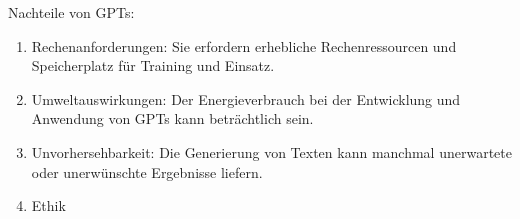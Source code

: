 Nachteile von GPTs:
\begin{enumerate}
    \item Rechenanforderungen: Sie erfordern erhebliche Rechenressourcen und Speicherplatz für Training und Einsatz.
    \item Umweltauswirkungen: Der Energieverbrauch bei der Entwicklung und Anwendung von GPTs kann beträchtlich sein.
    \item Unvorhersehbarkeit: Die Generierung von Texten kann manchmal unerwartete oder unerwünschte Ergebnisse liefern.
    \item Ethik
\end{enumerate}